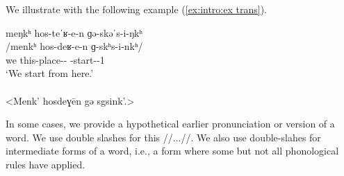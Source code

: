 We illustrate with the following example (\ref{ex:intro:ex trans}).  

\begin{exe}
	\ex \glll meŋkʰ hos-teˈʁ-e-n ɡə-skəˈs-i-ŋkʰ \\
	/menkʰ hos-deʁ-e-n ɡ-skʰs-i-nkʰ/ \\
	we this-place-{\abl}-{}  {\ind}-start-{\thgloss}-1{\pl}
	\\
	\trans `We start from here.' \label{ex:intro:ex trans}
	\\
	\\
	<Menk' hosdeɣēn gə sgsink'.> 
\end{exe}


In some cases, we provide a hypothetical earlier pronunciation or version of a word. We use double slashes for this //...//. We also use double-slahes for intermediate forms of a word, i.e., a form where some but not all phonological rules have applied. 